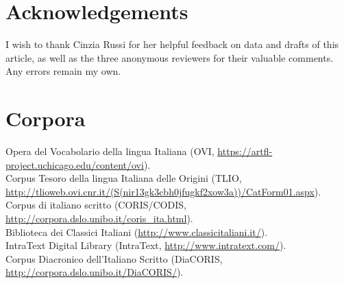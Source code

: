 \documentclass[output=paper,colorlinks,citecolor=brown]{langscibook}
\begin{document}
\section*{Acknowledgements}
I wish to thank Cinzia Russi for her helpful feedback on data and drafts of this article, as well as the three anonymous reviewers for their valuable comments. Any errors remain my own.

\section*{Corpora}
\smallskip Opera del Vocabolario della lingua Italiana (OVI, \url{https://artfl-project.uchicago.edu/content/ovi}).\\
\smallskip Corpus Tesoro della lingua Italiana delle Origini (TLIO, \url{http://tlioweb.ovi.cnr.it/(S(nir13gk3cbh0jfugkf2xow3a))/CatForm01.aspx}).\\
\smallskip Corpus di italiano scritto (CORIS/CODIS, \url{http://corpora.dslo.unibo.it/coris_ita.html}).\\
\smallskip Biblioteca dei Classici Italiani (\url{http://www.classicitaliani.it/}).\\
\smallskip IntraText Digital Library (IntraText, \url{http://www.intratext.com/}).\\
\smallskip Corpus Diacronico dell’Italiano Scritto (DiaCORIS, \url{http://corpora.dslo.unibo.it/DiaCORIS/}).
\end{document}
